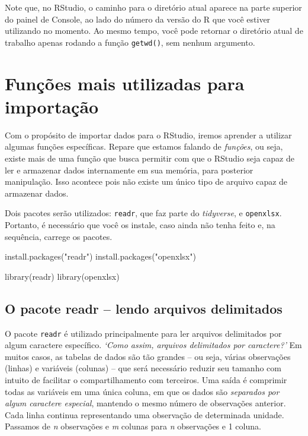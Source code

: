 \documentclass[
  letterpaper,
  DIV=11,
  numbers=noendperiod]{scrreprt}
\newenvironment{Shaded}{\begin{snugshade}}{\end{snugshade}}
\newcommand{\FunctionTok}[1]{\textcolor[rgb]{0.28,0.35,0.67}{#1}}
\newcommand{\NormalTok}[1]{\textcolor[rgb]{0.00,0.23,0.31}{#1}}
\newcommand{\StringTok}[1]{\textcolor[rgb]{0.13,0.47,0.30}{#1}}
\begin{document}
Note que, no RStudio, o caminho para o diretório atual aparece na parte
superior do painel de Console, ao lado do número da versão do R que você
estiver utilizando no momento. Ao mesmo tempo, você pode retornar o
diretório atual de trabalho apenas rodando a função \texttt{getwd()},
sem nenhum argumento.

\section{Funções mais utilizadas para
importação}\label{funuxe7uxf5es-mais-utilizadas-para-importauxe7uxe3o}

Com o propósito de importar dados para o RStudio, iremos aprender a
utilizar algumas funções específicas. Repare que estamos falando de
\emph{funções}, ou seja, existe mais de uma função que busca permitir
com que o RStudio seja capaz de ler e armazenar dados internamente em
sua memória, para posterior manipulação. Isso acontece pois não existe
um único tipo de arquivo capaz de armazenar dados.

Dois pacotes serão utilizados: \texttt{readr}, que faz parte do
\emph{tidyverse}, e \texttt{openxlsx}. Portanto, é necessário que você
os instale, caso ainda não tenha feito e, na sequência, carrege os
pacotes.

\begin{Shaded}
\begin{Highlighting}[]
\FunctionTok{install.packages}\NormalTok{(}\StringTok{"readr"}\NormalTok{)}
\FunctionTok{install.packages}\NormalTok{(}\StringTok{"openxlsx"}\NormalTok{)}

\FunctionTok{library}\NormalTok{(readr)}
\FunctionTok{library}\NormalTok{(openxlsx)}
\end{Highlighting}
\end{Shaded}

\subsection{O pacote readr -- lendo arquivos
delimitados}\label{o-pacote-readr-lendo-arquivos-delimitados}

O pacote \texttt{readr} é utilizado principalmente para ler arquivos
delimitados por algum caractere específico. \emph{`Como assim, arquivos
delimitados por caractere?'} Em muitos casos, as tabelas de dados são
tão grandes -- ou seja, várias observações (linhas) e variáveis
(colunas) -- que será necessário reduzir seu tamanho com intuito de
facilitar o compartilhamento com terceiros. Uma saída é comprimir todas
as variáveis em uma única coluna, em que os dados são \emph{separados
por algum caractere especial}, mantendo o mesmo número de observações
anterior. Cada linha continua representando uma observação de
determinada unidade. Passamos de \emph{n} observações e \emph{m} colunas
para \emph{n} observações e 1 coluna.
\end{document}

